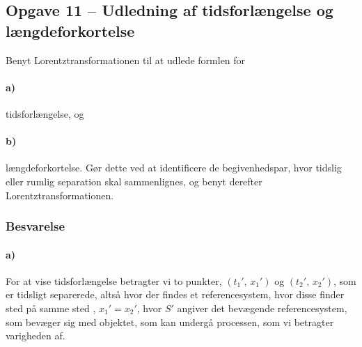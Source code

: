 \documentclass[../main.tex]{subfiles}
\begin{document}

\subsection{Opgave 11 -- Udledning af tidsforlængelse og længdeforkortelse}
\setcounter{subsection}{11}
\setcounter{equation}{0}

Benyt Lorentztransformationen til at udlede formlen for
\paragraph{a)} tidsforlængelse, og
\paragraph{b)} længdeforkortelse.
Gør dette ved at identificere de begivenhedspar, hvor tidslig eller rumlig separation skal sammenlignes, og benyt derefter Lorentztransformationen.


\subsubsection{Besvarelse}


\paragraph{a)}

For at vise tidsforlængelse betragter vi to punkter, $(t_1',\, x_1')$ og $(t_2',\, x_2')$, som er tidsligt separerede, altså hvor der findes et referencesystem, hvor disse finder sted på samme sted \cite[kapitel 11.2]{uggerhoj_specielRel}, $x_1' = x_2'$, hvor $S'$ angiver det bevægende referencesystem, som bevæger sig med objektet, som kan undergå processen, som vi betragter varigheden af.
\end{document}
